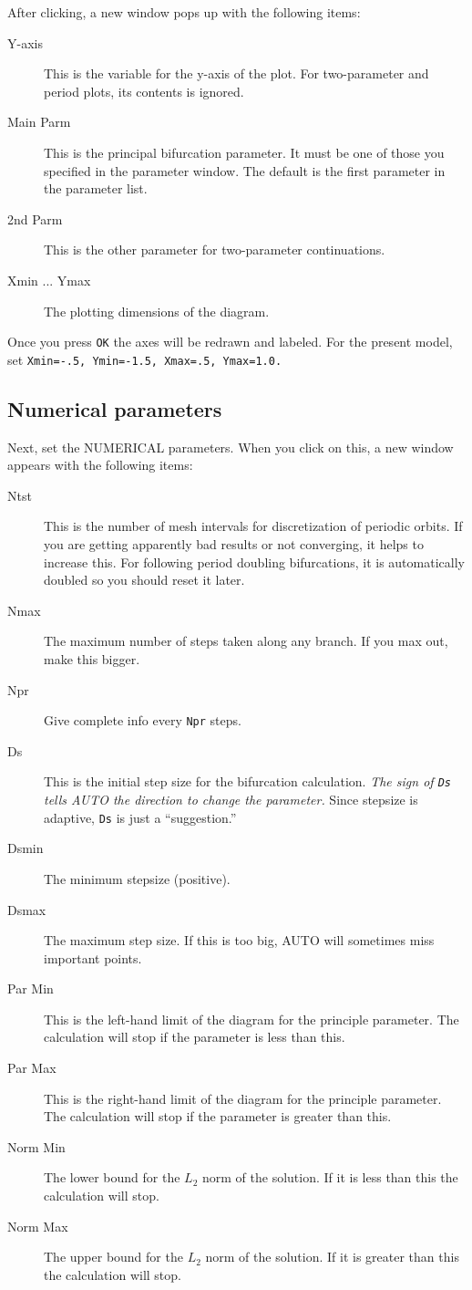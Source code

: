\documentclass{article}
\begin{document}
After clicking, a new window pops up with the following items:
\begin{description}
\item[Y-axis] This is the variable for the y-axis of the plot.  For
two-parameter and period plots, its contents is ignored.
\item[Main Parm] This is the principal bifurcation parameter.  It must
be one of those you specified in the parameter window.  The default is
the first parameter in the parameter list.
\item[2nd Parm] This is the other parameter for two-parameter
continuations.
\item[Xmin ... Ymax] The plotting dimensions of the diagram.
\end{description}

Once you press {\tt OK} the axes will be redrawn and labeled.
For the present model, set {\tt Xmin=-.5, Ymin=-1.5, Xmax=.5,
Ymax=1.0.}
\subsection{Numerical parameters}

Next, set the NUMERICAL parameters.  When you click on this, a new
window appears with the following items:

\begin{description}
\item[Ntst] This is the number of mesh intervals for discretization
of periodic orbits.
If you are getting apparently bad results or not converging, it helps
to increase this.  For following period doubling bifurcations, it is
automatically doubled so you should reset it later.
\item[Nmax] The maximum number of steps taken along any branch.  If
you max out, make this bigger.
\item[Npr] Give complete info every {\tt Npr} steps.
\item[Ds] This is the initial step size for the bifurcation
calculation. {\em The sign of {\tt Ds} tells AUTO the direction to
change the parameter.} Since stepsize is adaptive, {\tt Ds} is just a
``suggestion.''
\item[Dsmin] The minimum stepsize (positive).
\item[Dsmax] The maximum step size.  If this is too big, AUTO will
sometimes miss important points.
\item[Par Min] This is the left-hand limit of the diagram for the
principle parameter. The calculation will stop if the parameter is
less than this.
\item[Par Max] This is the right-hand limit of the diagram for the
principle parameter. The calculation will stop if the parameter is
greater than this.
\item[Norm Min] The lower bound for the $L_2$ norm of the solution.  If it
is less than this the calculation will stop.
\item[Norm Max] The upper bound for the $L_2$ norm of the solution.  If it
is greater than this the calculation will stop.
\end{description}
\end{document}

